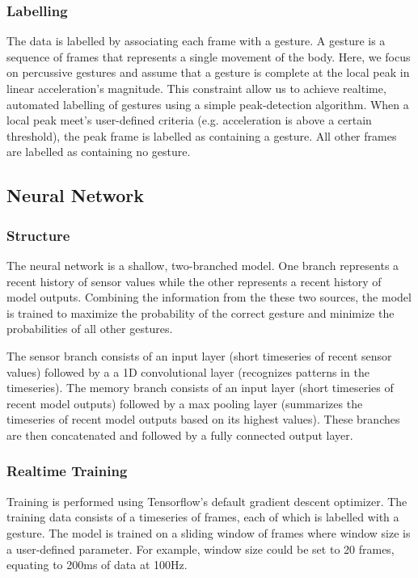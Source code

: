 \documentclass{article}
\begin{document}
\subsubsection{Labelling}
The data is labelled by associating each frame with a gesture. A gesture is a sequence of frames that represents a single movement of the body. Here, we focus on percussive gestures and assume that a gesture is complete at the local peak in linear acceleration's magnitude. This constraint allow us to achieve realtime, automated labelling of gestures using a simple peak-detection algorithm. When a local peak meet's user-defined criteria (e.g. acceleration is above a certain threshold), the peak frame is labelled as containing a gesture. All other frames are labelled as containing no gesture.

\subsection{Neural Network}
\subsubsection{Structure}
The neural network is a shallow, two-branched model. One branch represents a recent history of sensor values while the other represents a recent history of model outputs. Combining the information from the these two sources, the model is trained to maximize the probability of the correct gesture and minimize the probabilities of all other gestures.

The sensor branch consists of an input layer (short timeseries of recent sensor values) followed by a  a 1D convolutional layer (recognizes patterns in the timeseries). The memory branch consists of an input layer (short timeseries of recent model outputs) followed by a max pooling layer (summarizes the timeseries of recent model outputs based on its highest values). These branches are then concatenated and followed by a fully connected output layer. 

\subsubsection{Realtime Training}
Training is performed using Tensorflow's default gradient descent optimizer. The training data consists of a timeseries of frames, each of which is labelled with a gesture. The model is trained on a sliding window of frames where window size is a user-defined parameter. For example, window size could be set to 20 frames, equating to 200ms of data at 100Hz. 
\end{document}
